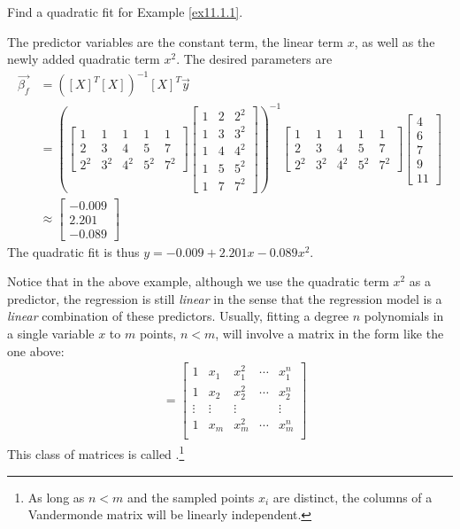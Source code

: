 \begin{exmp}
Find a quadratic fit for Example \ref{ex11.1.1}.
\end{exmp}
\begin{solution}
The predictor variables are the constant term, the linear term $x$, as well as the newly added quadratic term $x^2$. The desired parameters are
\begin{align*}
\vec{\beta_f} &= ([X]^T[X])^{-1}[X]^T \vec{y} \\
&=
\left(
\begin{bmatrix}
1 & 1 & 1 & 1 & 1 \\
2 & 3 & 4 & 5 & 7 \\
2^2 & 3^2 & 4^2 & 5^2 & 7^2
\end{bmatrix}
\begin{bmatrix}
1 & 2 & 2^2 \\
1 & 3 & 3^2 \\
1 & 4 & 4^2 \\
1 & 5 & 5^2 \\
1 & 7 & 7^2 
\end{bmatrix}
\right)^{-1}
\begin{bmatrix}
1 & 1 & 1 & 1 & 1 \\
2 & 3 & 4 & 5 & 7 \\
2^2 & 3^2 & 4^2 & 5^2 & 7^2
\end{bmatrix}
\begin{bmatrix}
4 \\
6 \\
7 \\
9 \\
11
\end{bmatrix} \\
& \approx
\begin{bmatrix}
-0.009 \\
2.201 \\
-0.089 
\end{bmatrix}
\end{align*}
The quadratic fit is thus $y = -0.009 + 2.201x - 0.089x^2$.
\end{solution}
Notice that in the above example, although we use the quadratic term $x^2$ as a predictor, the regression is still \textit{linear} in the sense that the regression model is a \textit{linear} combination of these predictors. Usually, fitting a degree $n$ polynomials in a single variable $x$ to $m$ points, $n < m$, will involve a matrix in the form like the one above:
\begin{align*}
[X]
&= 
\begin{bmatrix}
1 & x_1 & x_1^2 & \cdots & x_1^n \\
1 & x_2 & x_2^2 & \cdots & x_2^n \\
\vdots & \vdots & \vdots & & \vdots \\
1 & x_m & x_m^2 & \cdots & x_m^n \\
\end{bmatrix} 
\end{align*}
This class of matrices is called .\footnote{As long as $n < m$ and the sampled points $x_i$ are distinct, the columns of a Vandermonde matrix will be linearly independent.}

